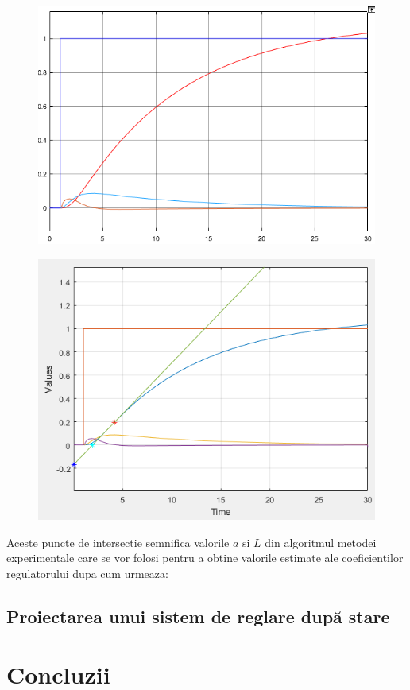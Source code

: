 \documentclass[11pt]{article}
\begin{document}
\begin{figure}[H]
	\centering
	\begin{minipage}{.5\textwidth}
		\centering
		\includegraphics[width=.9\linewidth]{zn_pr.png}
		\label{fig:test1}
	\end{minipage}%
	\begin{minipage}{.5\textwidth}
		\centering
		\includegraphics[width=.9\linewidth]{zn_pct.png}
		\label{fig:test2}
	\end{minipage}
\end{figure}
Aceste puncte de intersectie semnifica valorile $a$ si $L$ din algoritmul metodei experimentale care se vor folosi pentru a obtine valorile estimate ale coeficientilor regulatorului dupa cum urmeaza: 
\subsection{Proiectarea unui sistem de reglare după stare}
\newpage

\section{Concluzii}

\newpage


\end{document}

